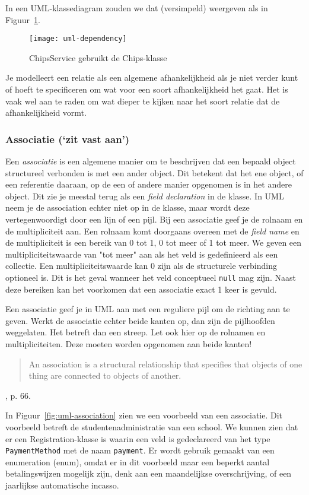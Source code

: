In een UML-klassediagram zouden we dat (versimpeld) weergeven 
als in Figuur~\ref{fig:uml-dependency}.

\begin{figure}[H]
    \centering
    \texttt{[image: uml-dependency]}
    \caption{ChipsService gebruikt de Chips-klasse}
    \label{fig:uml-dependency}
\end{figure}

Je modelleert een relatie als een algemene afhankelijkheid 
als je niet verder kunt of hoeft te specificeren om wat 
voor een soort afhankelijkheid het gaat. Het is vaak wel 
aan te raden om wat dieper te kijken naar het soort relatie
dat de afhankelijkheid vormt.

\subsubsection{Associatie (`zit vast aan')}
Een \textit{associatie} is een algemene manier om te beschrijven dat een 
bepaald object structureel verbonden is met een ander object.
Dit betekent dat het ene object, of een referentie daaraan, 
op de een of andere manier opgenomen is in het andere object.
Dit zie je meestal terug als een \textit{field declaration}
in de klasse. In UML neem je de association echter niet 
op in de klasse, maar wordt deze vertegenwoordigt door een 
lijn of een pijl. Bij een associatie geef je de rolnaam en de 
multipliciteit aan. Een rolnaam komt doorgaans overeen met 
de \textit{field name} en de multipliciteit is een bereik 
van 0 tot 1, 0 tot meer of 1 tot meer. We geven een 
multipliciteitswaarde van "tot meer" aan als het veld is 
gedefinieerd als een collectie.
Een multipliciteitswaarde kan 0 
zijn als de structurele verbinding optioneel is. Dit is het 
geval wanneer het veld conceptueel \texttt{null} mag zijn. 
Naast deze bereiken kan het voorkomen dat een associatie 
exact 1 keer is gevuld.

Een associatie geef je in UML aan met een reguliere pijl om 
de richting aan te geven. Werkt de associatie echter beide kanten op,
dan zijn de pijlhoofden weggelaten. Het betreft dan een streep.
Let ook hier op de rolnamen en multipliciteiten. Deze moeten worden 
opgenomen aan beide kanten!

\blockquote{
    An association is a structural relationship that specifies that objects
    of one thing are connected to objects of another.
}{\cite{Booch1999}, p. 66.}

In Figuur~\ref{fig:uml-association} zien we een voorbeeld van een associatie.
Dit voorbeeld betreft de studentenadministratie van een school.
We kunnen zien dat er een Registration-klasse is waarin een
veld is gedeclareerd van het type \texttt{PaymentMethod} met de naam \texttt{payment}.
Er wordt gebruik gemaakt van een enumeration (enum), 
omdat er in dit voorbeeld maar een beperkt aantal betalingswijzen mogelijk zijn,
 denk aan een maandelijkse overschrijving, of een jaarlijkse automatische incasso.

